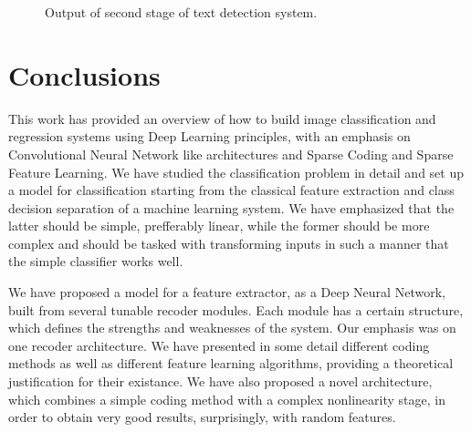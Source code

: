 \documentclass[12pt,a4paper,oneside,english]{UPBThesis}
\begin{document}
\begin{figure}
\centering
{}
\caption{Output of second stage of text detection system.}
\label{fig:TextDetectStage2}
\end{figure}

\clearpage
\newpage
\thispagestyle{empty}
\mbox{}

\chapter{Conclusions}
\label{chap:Conclusions}

This work has provided an overview of how to build image classification and regression systems using Deep Learning principles, with an emphasis on Convolutional Neural Network like architectures and Sparse Coding and Sparse Feature Learning. We have studied the classification problem in detail and set up a model for classification starting from the classical feature extraction and class decision separation of a machine learning system. We have emphasized that the latter should be simple, prefferably linear, while the former should be more complex and should be tasked with transforming inputs in such a manner that the simple classifier works well.

We have proposed a model for a feature extractor, as a Deep Neural Network, built from several tunable recoder modules. Each module has a certain structure, which defines the strengths and weaknesses of the system. Our emphasis was on one recoder architecture. We have presented in some detail different coding methods as well as different feature learning algorithms, providing a theoretical justification for their existance. We have also proposed a novel architecture, which combines a simple coding method with a complex nonlinearity stage, in order to obtain very good results, surprisingly, with random features.
\end{document}
